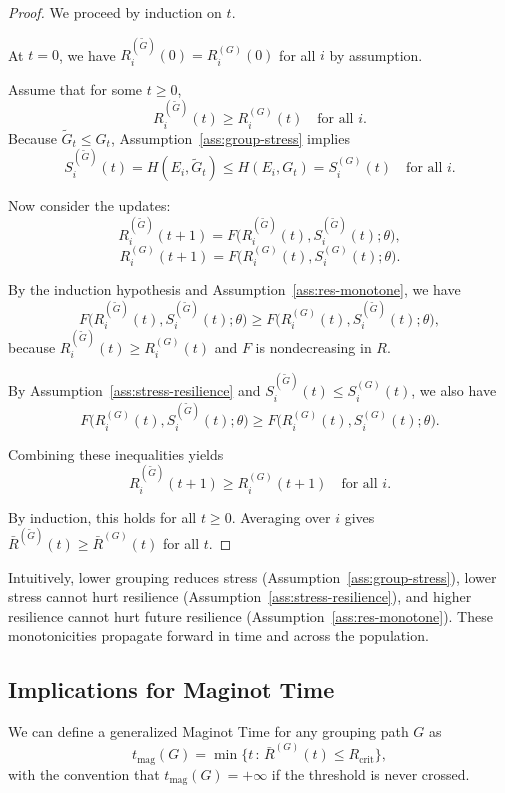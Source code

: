 \documentclass[11pt]{article}
\theoremstyle{plain}
\begin{document}
\begin{proof}
We proceed by induction on $t$.

At $t=0$, we have $R_i^{(\tilde{G})}(0) = R_i^{(G)}(0)$ for all $i$ by assumption.

Assume that for some $t \ge 0$,
\[
R_i^{(\tilde{G})}(t) \ge R_i^{(G)}(t) \quad \text{for all } i.
\]
Because $\tilde{G}_t \le G_t$, Assumption~\ref{ass:group-stress} implies
\[
S_i^{(\tilde{G})}(t) = H(E_i, \tilde{G}_t) \le H(E_i, G_t) = S_i^{(G)}(t) \quad \text{for all } i.
\]

Now consider the updates:
\[
R_i^{(\tilde{G})}(t+1)
= F\bigl(R_i^{(\tilde{G})}(t), S_i^{(\tilde{G})}(t); \theta\bigr),
\]
\[
R_i^{(G)}(t+1)
= F\bigl(R_i^{(G)}(t), S_i^{(G)}(t); \theta\bigr).
\]

By the induction hypothesis and Assumption~\ref{ass:res-monotone}, we have
\[
F\bigl(R_i^{(\tilde{G})}(t), S_i^{(\tilde{G})}(t); \theta\bigr)
\ge F\bigl(R_i^{(G)}(t), S_i^{(\tilde{G})}(t); \theta\bigr),
\]
because $R_i^{(\tilde{G})}(t) \ge R_i^{(G)}(t)$ and $F$ is nondecreasing in $R$.

By Assumption~\ref{ass:stress-resilience} and $S_i^{(\tilde{G})}(t) \le S_i^{(G)}(t)$, we also have
\[
F\bigl(R_i^{(G)}(t), S_i^{(\tilde{G})}(t); \theta\bigr)
\ge F\bigl(R_i^{(G)}(t), S_i^{(G)}(t); \theta\bigr).
\]

Combining these inequalities yields
\[
R_i^{(\tilde{G})}(t+1) \ge R_i^{(G)}(t+1) \quad \text{for all } i.
\]

By induction, this holds for all $t \ge 0$.
Averaging over $i$ gives $\bar{R}^{(\tilde{G})}(t) \ge \bar{R}^{(G)}(t)$ for all $t$.
\end{proof}

Intuitively, lower grouping reduces stress (Assumption~\ref{ass:group-stress}), lower stress cannot hurt resilience (Assumption~\ref{ass:stress-resilience}), and higher resilience cannot hurt future resilience (Assumption~\ref{ass:res-monotone}).
These monotonicities propagate forward in time and across the population.

\subsection{Implications for Maginot Time}

We can define a generalized Maginot Time for any grouping path $G$ as
\[
t_{\text{mag}}(G) = \min\{ t \,:\, \bar{R}^{(G)}(t) \le R_{\text{crit}}\},
\]
with the convention that $t_{\text{mag}}(G) = +\infty$ if the threshold is never crossed.
\end{document}
